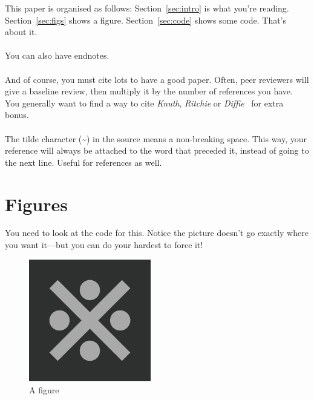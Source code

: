 \documentclass[letterpaper,twocolumn,10pt,final]{article}
\begin{document}
This paper is organised as follows: Section~\ref{sec:intro} is what you're reading. Section~\ref{sec:figs} shows a figure. Section~\ref{sec:code} shows some code. That's about it.
\\
\\
You can also have endnotes. 
\\
\\
And of course, you must cite lots to have a good paper. Often, peer reviewers will give a baseline review, then multiply it by the number of references you have. You generally want to find a way to cite \textit{Knuth}, \textit{Ritchie} or \textit{Diffie}~\cite{Diffie1976} for extra bonus.
\\
\\
The tilde character (\~{}) in the source means a non-breaking space. This way, your reference will always be attached to the word that preceded it, instead of going to the next line. Useful for references as well.

\section{\label{sec:figs}Figures}

You need to look at the code for this. Notice the picture doesn't go exactly where you want it---but you can do your hardest to force it!

\begin{figure}[h!]
    \centering
        \includegraphics[width=0.475\textwidth]{fig}
    \caption{A figure}
    \label{fig:figure1}
\end{figure}
\end{document}
